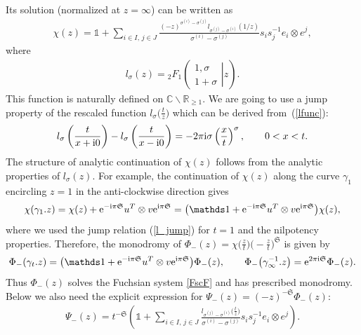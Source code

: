\documentclass[pdftex]{sigma}
\newcommand\Cb{\mathbb{C}}
\def\mf{\mathfrak}
\numberwithin{equation}{section}
\begin{document}
Its solution (normalized at $z=\infty$) can be written as
\begin{gather*}
\chi(z)=\mathds 1+\sum_{i\in I,\, j\in J}\frac{ (-z)^{\sigma^{(i)}-\sigma^{(j)}} l_{\sigma^{(j)}-\sigma^{(i)}}(1/z)}{\sigma^{(i)}-\sigma^{(j)}} s_i s_j^{-1} e_i\otimes e^j ,
\end{gather*}
where
\begin{gather}\label{lfunc}
l_\sigma(z)={}_2F_1\left(\left.\begin{matrix}
1,\sigma \\ 1+\sigma\end{matrix}\right|z\right).
\end{gather}
This function is naturally defined on $\Cb\backslash\mathbb R_{\ge1}$. We are going to use a jump property of the rescaled function $l_\sigma\big(\frac tz\big)$ which can be derived from~(\ref{lfunc}):
\begin{gather}\label{l_jump}
l_\sigma\left(\frac{t}{x+{\rm i}0}\right) - l_\sigma\left(\frac{t}{x-{\rm i}0}\right)=-2\pi{\rm i} \sigma \left(\frac{x}{t}\right) ^\sigma,\qquad 0<x<t .
\end{gather}
The structure of analytic continuation of $\chi(z)$ follows from the analytic properties of $l_\sigma(z)$. For example, the continuation of $\chi(z)$ along the curve $\gamma_1$ encircling $z=1$ in the anti-clockwise direction gives
\begin{gather*}
\chi(\gamma_1.z)=\chi(z)+{\rm e}^{-{\rm i}\pi {\mf S}} u^T \otimes v {\rm e}^{{\rm i}\pi {\mf S}} =\big(\mathds 1+{\rm e}^{-{\rm i}\pi {\mf S}} u^T \otimes v {\rm e}^{{\rm i}\pi {\mf S}}\big)\chi(z),
\end{gather*}
where we used the jump relation (\ref{l_jump}) for $t=1$ and the nilpotency properties. Therefore, the monodromy of $\Phi_-(z)=\chi\big(\frac zt\big) \big({-}\frac zt\big)^{\mf S}$ is given by
\begin{gather*}
\Phi_-(\gamma_t.z)=\big(\mathds 1+{\rm e}^{-{\rm i}\pi {\mf S}} u^T \otimes v {\rm e}^{{\rm i}\pi {\mf S}} \big)\Phi_-(z),\qquad \Phi_-\big(\gamma_\infty^{-1}.z\big)={\rm e}^{2\pi{\rm i}\mf S}\Phi_-(z).
\end{gather*}
Thus $\Phi_-(z)$ solves the Fuchsian system \eqref{FscF} and has prescribed monodromy. Below we also need the explicit expression for $\Psi_-(z)=(-z)^{-\mf S}\Phi_-(z)$:
\begin{gather}\label{Psim_series}
\Psi_-(z)=t^{-\mf S}\left({\mathds 1}+\sum_{{i\in I,\, j\in J}}\frac{l_{\sigma^{(j)}-\sigma^{(i)}}\big(\frac tz\big)}{\sigma^{(i)}-\sigma^{(j)}} s_is_j^{-1} e_i\otimes e^j\right).
\end{gather}
\end{document}
